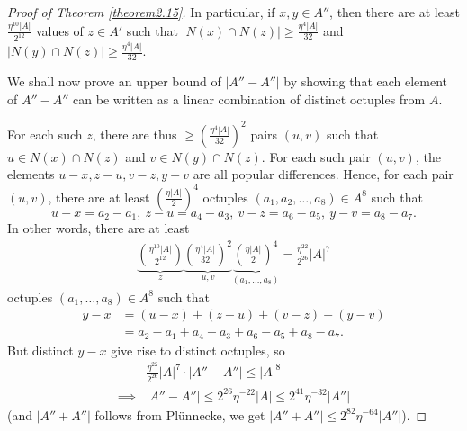 \documentclass{article}
\theoremstyle{definition}
\begin{document}
\begin{proof}[Proof of Theorem \ref{theorem2.15}]
    In particular, if $x,y \in A''$, then there are at least $\frac{\eta^{10}\left|A\right|}{2^{12}}$ values of $z \in A'$ such that $\left|N(x) \cap N(z)\right|\ge \frac{\eta^4\left|A\right|}{32}$ and $\left|N(y) \cap N(z)\right|\ge \frac{\eta^4\left|A\right|}{32}$.
    \vspace{1mm}
     
    We shall now prove an upper bound of $\left|A'' - A''\right|$ by showing that each element of $A''-A''$ can be written as a linear combination of distinct octuples from $A$. 

    \vspace{1mm}
     
    For each such $z$, there are thus $\ge \left(\frac{\eta^4\left|A\right|}{32}\right)^2$ pairs $(u,v)$ such that $u \in N(x) \cap N(z)$ and $v \in N(y) \cap N(z)$. For each such pair $(u,v)$, the elements $u-x,z-u,v-z,y-v$ are all popular differences. Hence, for each pair $(u,v)$, there are at least $\left(\frac{\eta\left|A\right|}{2}\right)^4$ octuples $(a_1,a_2,\ldots,a_8) \in A^8$ such that \[
    u-x = a_2-a_1,~ z-u = a_4-a_3, ~ v-z = a_6 - a_5, ~ y-v = a_8-a_7.
    \]
    In other words, there are at least 
    \begin{align*}
        \underbrace{\left(\frac{\eta^{10}\left|A\right|}{2^{12}}\right)}_{z}\underbrace{\left(\frac{\eta^4 \left|A\right|}{32}\right)^2}_{u,v} \underbrace{\left(\frac{\eta \left|A\right|}{2}\right)^4}_{(a_1,\ldots,a_8)} = \frac{\eta^{22}}{2^{26}}\left|A\right|^7
    \end{align*}
    octuples $(a_1,\ldots,a_8) \in A^8$ such that 
    \begin{align*}
        y-x &= (u-x)  +(z-u) + (v-z) + (y-v) \\
        &= a_2-a_1 + a_4-a_3 + a_6-a_5 + a_8-a_7.
    \end{align*}
    But distinct $y-x$ give rise to distinct octuples, so 
    \begin{align*}
        &\frac{\eta^{22}}{2^{26}}\left|A\right|^7 \cdot \left|A''-A''\right| \le \left|A\right|^8 \\
        \implies& \left|A''-A''\right| \le 2^{26}\eta^{-22}\left|A\right| \le 2^{41}\eta^{-32}\left|A''\right| 
    \end{align*}
    (and $\left|A''+A''\right|$ follows from Plünnecke, we get $\left|A''+A''\right|\le 2^{82}\eta^{-64}\left|A''\right|$).
\end{proof}
\end{document}
